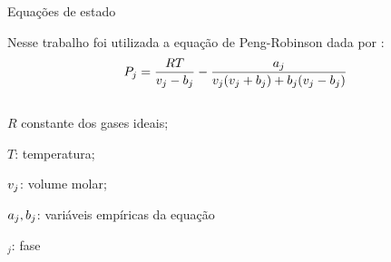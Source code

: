 \documentclass[professionalfont]{beamer}
\begin{document}
\begin{frame}{Equações de estado}



    
    Nesse trabalho foi utilizada a equação de Peng-Robinson dada por \cite{Chen2007}:
    \begin{equation}
        \label{eq:eos.1}
        P_{j} = \dfrac{R T}{v_{j} - b_{j}} - \dfrac{a_{j}}{v_{j}(v_{j} + b_{j}) + b_{j}(v_{j} - b_{j})}
    \end{equation}
    \begin{columns}
        \begin{column}{0.6\textwidth}
            \begin{description}[]
                \item $R$ constante dos gases ideais;
                \item $T$: temperatura;
                \item $v_{j}$: volume molar;
                \item $a_{j}, b_{j}$: variáveis empíricas da equação
                \item $_{j}$: fase
            \end{description}
        \end{column}
    \end{columns}
    
\end{frame}
\end{document}
